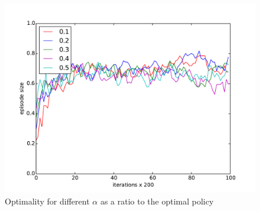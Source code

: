 \documentclass[paper=a4, fontsize=11pt]{scrartcl}
\numberwithin{equation}{section}		%
\numberwithin{figure}{section}			%
\numberwithin{table}{section}				%
\begin{document}
\begin{figure}[H] \centering
\includegraphics[scale=0.4]{alphaOptimality.pdf}
\caption{Optimality for different $\alpha$ as a ratio to the optimal policy} 
\label{figure:alphaOpti}
\end{figure}
\end{document}
